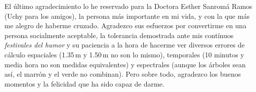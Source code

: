 El último agradecimiento lo he reservado para la Doctora Esther Sanromá Ramos (Uchy para los amigos), la persona más importante en mi vida, y con la que más me alegro de haberme cruzado. Agradezco sus esfuerzos por convertirme en una persona socialmente aceptable, la tolerancia demostrada ante mis contínuos \emph{festivales del humor} y su paciencia a la hora de hacerme ver diversos errores de cálculo espaciales (1.35\,m y 1.50\,m no son lo mismo), temporales (10 minutos y media hora no son medidas equivalentes) y espectrales (aunque los árboles sean así, el marrón y el verde no combinan). Pero sobre todo, agradezco los buenos momentos y la felicidad que ha sido capaz de darme.








